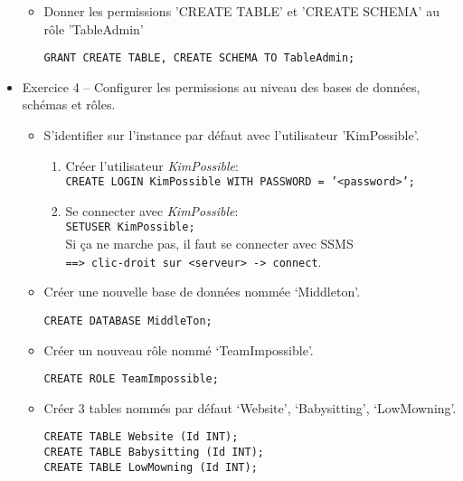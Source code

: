 \documentclass[a4paper]{article}
\begin{document}
\begin{itemize}
\begin{itemize}
\item Donner les permissions 'CREATE TABLE' et 'CREATE SCHEMA' au rôle 'TableAdmin'
\begin{example} \begin{verbatim}
GRANT CREATE TABLE, CREATE SCHEMA TO TableAdmin;
\end{verbatim} \end{example}

\end{itemize}



\item Exercice 4 -- Configurer les permissions au niveau des bases de données, schémas et rôles.
\begin{itemize}

\item S’identifier sur l’instance par défaut avec l’utilisateur 'KimPossible'.
\begin{example}
\begin{enumerate}
    \item Créer l'utilisateur \textit{KimPossible}: \\
    \texttt{CREATE LOGIN KimPossible WITH PASSWORD = '<password>';}
    \item Se connecter avec \textit{KimPossible}: \\
    \texttt{SETUSER KimPossible;} \\
    Si ça ne marche pas, il faut se connecter avec SSMS \\
    \texttt{==> clic-droit sur <serveur> -> connect}.
\end{enumerate}
\end{example}

\item Créer une nouvelle base de données nommée ‘Middleton’.
\begin{example} \begin{verbatim}
CREATE DATABASE MiddleTon;
\end{verbatim} \end{example}

\item Créer un nouveau rôle nommé ‘TeamImpossible’.
\begin{example} \begin{verbatim}
CREATE ROLE TeamImpossible;
\end{verbatim} \end{example}

\item Créer 3 tables nommés par défaut ‘Website’, ‘Babysitting’, ‘LowMowning’.
\begin{example} \begin{verbatim}
CREATE TABLE Website (Id INT);
CREATE TABLE Babysitting (Id INT);
CREATE TABLE LowMowning (Id INT);
\end{verbatim} \end{example}


\end{itemize}
\end{itemize}
\end{document}
